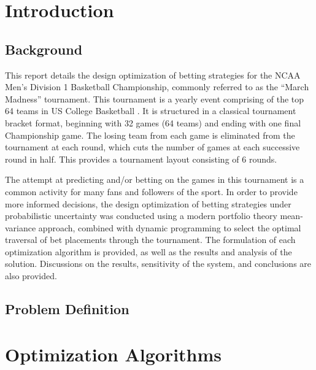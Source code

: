 \documentclass[12pt]{article}
\begin{document}


\dotableofcontents

\newpage
\doublespacing
{}
\section{Introduction}
\setlength{\parindent}{1cm}
\subsection{Background}
This report details the design optimization of betting strategies for the NCAA Men's Division 1 Basketball Championship, commonly referred to as the ``March Madness'' tournament.
This tournament is a yearly event comprising of the top 64 teams in US College Basketball \cite{doi:10.1080/00031305.1996.10473540}.
It is structured in a classical tournament bracket format, beginning with 32 games (64 teams) and ending with one final Championship game.
The losing team from each game is eliminated from the tournament at each round, which cuts the number of games at each successive round in half.
This provides a tournament layout consisting of 6 rounds.

The attempt at predicting and/or betting on the games in this tournament is a common activity for many fans and followers of the sport.
In order to provide more informed decisions, the design optimization of betting strategies under probabilistic uncertainty was conducted using a modern portfolio theory mean-variance approach, combined with dynamic programming to select the optimal traversal of bet placements through the tournament.
The formulation of each optimization algorithm is provided, as well as the results and analysis of the solution.
Discussions on the results, sensitivity of the system, and conclusions are also provided. 

\subsection{Problem Definition}


\newpage
\section{Optimization Algorithms}
\end{document}
